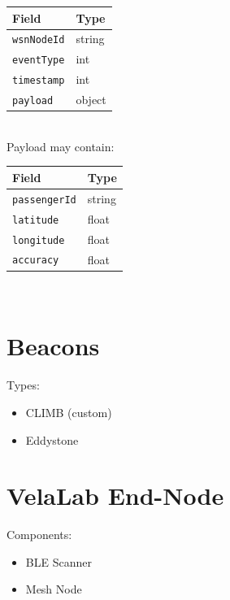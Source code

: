 \documentclass[12pt]{article}
\begin{document}
\begin{tabular}{l|l}
Field 			& Type\\
\hline
\texttt{wsnNodeId} 		& string	 \\
\texttt{eventType} 		& int		 \\
\texttt{timestamp} 		& int		 \\
\texttt{payload} 			& object	 \\
\end{tabular}
\\

Payload may contain:
\\

\begin{tabular}{l|l}
Field 			& Type 	\\
\hline
\texttt{passengerId} 		& string	 \\
\texttt{latitude} 			& float	 \\
\texttt{longitude} 		& float	 \\
\texttt{accuracy} 			& float	 \\
\end{tabular}
\\



\section{Beacons}

Types:
\begin{itemize}
\item{CLIMB (custom)}
\item{Eddystone}
\end{itemize}




\section{VelaLab End-Node}

Components:
\begin{itemize}
\item{BLE Scanner}
\item{Mesh Node}
\end{itemize}
\end{document}
